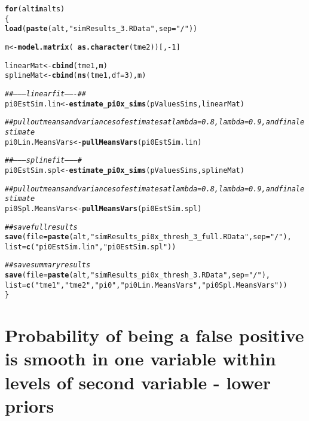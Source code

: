 \documentclass{article}\usepackage[]{graphicx}\usepackage[]{color}
\makeatletter
\newcommand{\hlnum}[1]{\textcolor[rgb]{0.686,0.059,0.569}{#1}}%
\newcommand{\hlstr}[1]{\textcolor[rgb]{0.192,0.494,0.8}{#1}}%
\newcommand{\hlcom}[1]{\textcolor[rgb]{0.678,0.584,0.686}{\textit{#1}}}%
\newcommand{\hlopt}[1]{\textcolor[rgb]{0,0,0}{#1}}%
\newcommand{\hlstd}[1]{\textcolor[rgb]{0.345,0.345,0.345}{#1}}%
\newcommand{\hlkwa}[1]{\textcolor[rgb]{0.161,0.373,0.58}{\textbf{#1}}}%
\newcommand{\hlkwb}[1]{\textcolor[rgb]{0.69,0.353,0.396}{#1}}%
\newcommand{\hlkwc}[1]{\textcolor[rgb]{0.333,0.667,0.333}{#1}}%
\newcommand{\hlkwd}[1]{\textcolor[rgb]{0.737,0.353,0.396}{\textbf{#1}}}%
\newenvironment{kframe}{%
 \def\at@end@of@kframe{}%
 \ifinner\ifhmode%
  \def\at@end@of@kframe{\end{minipage}}%
  \begin{minipage}{\columnwidth}%
 \fi\fi%
 \def\FrameCommand##1{\hskip\@totalleftmargin \hskip-\fboxsep
 \colorbox{shadecolor}{##1}\hskip-\fboxsep
     \hskip-\linewidth \hskip-\@totalleftmargin \hskip\columnwidth}%
 \MakeFramed {\advance\hsize-\width
   \@totalleftmargin\z@ \linewidth\hsize
   \@setminipage}}%
 {\par\unskip\endMakeFramed%
 \at@end@of@kframe}
\newenvironment{knitrout}{}{} %
\makeatother
\begin{document}
\begin{knitrout}
\color{fgcolor}\begin{kframe}
\begin{alltt}
\hlkwa{for}\hlstd{(alt} \hlkwa{in} \hlstd{alts)}
\hlstd{\{}
  \hlkwd{load}\hlstd{(}\hlkwd{paste}\hlstd{(alt,}\hlstr{"simResults_3.RData"}\hlstd{,}\hlkwc{sep}\hlstd{=}\hlstr{"/"}\hlstd{))}

  \hlstd{m} \hlkwb{<-} \hlkwd{model.matrix}\hlstd{(}\hlopt{~}\hlkwd{as.character}\hlstd{(tme2))[,}\hlopt{-}\hlnum{1}\hlstd{]}

  \hlstd{linearMat} \hlkwb{<-} \hlkwd{cbind}\hlstd{(tme1, m)}
  \hlstd{splineMat} \hlkwb{<-} \hlkwd{cbind}\hlstd{(}\hlkwd{ns}\hlstd{(tme1,}\hlkwc{df}\hlstd{=}\hlnum{3}\hlstd{), m)}

  \hlcom{##--------linear fit-------##}
  \hlstd{pi0EstSim.lin} \hlkwb{<-} \hlkwd{estimate_pi0x_sims}\hlstd{(pValuesSims, linearMat)}

  \hlcom{##pull out means and variances of estimates at lambda=0.8, lambda=0.9, and final estimate}
  \hlstd{pi0Lin.MeansVars} \hlkwb{<-} \hlkwd{pullMeansVars}\hlstd{(pi0EstSim.lin)}

  \hlcom{##---------spline fit---------#}
  \hlstd{pi0EstSim.spl} \hlkwb{<-} \hlkwd{estimate_pi0x_sims}\hlstd{(pValuesSims, splineMat)}

  \hlcom{##pull out means and variances of estimates at lambda=0.8, lambda=0.9, and final estimate}
  \hlstd{pi0Spl.MeansVars} \hlkwb{<-} \hlkwd{pullMeansVars}\hlstd{(pi0EstSim.spl)}

  \hlcom{##save full results}
  \hlkwd{save}\hlstd{(}\hlkwc{file}\hlstd{=}\hlkwd{paste}\hlstd{(alt,}\hlstr{"simResults_pi0x_thresh_3_full.RData"}\hlstd{,}\hlkwc{sep}\hlstd{=}\hlstr{"/"}\hlstd{),}
       \hlkwc{list}\hlstd{=}\hlkwd{c}\hlstd{(}\hlstr{"pi0EstSim.lin"}\hlstd{,}\hlstr{"pi0EstSim.spl"}\hlstd{))}

  \hlcom{##save summary results}
  \hlkwd{save}\hlstd{(}\hlkwc{file}\hlstd{=}\hlkwd{paste}\hlstd{(alt,}\hlstr{"simResults_pi0x_thresh_3.RData"}\hlstd{,}\hlkwc{sep}\hlstd{=}\hlstr{"/"}\hlstd{),}
       \hlkwc{list}\hlstd{=}\hlkwd{c}\hlstd{(}\hlstr{"tme1"}\hlstd{,} \hlstr{"tme2"}\hlstd{,} \hlstr{"pi0"}\hlstd{,} \hlstr{"pi0Lin.MeansVars"}\hlstd{,} \hlstr{"pi0Spl.MeansVars"}\hlstd{))}
\hlstd{\}}
\end{alltt}
\end{kframe}
\end{knitrout}

\section{Probability of being a false positive is smooth in one variable within levels of second variable - lower priors}
\end{document}
